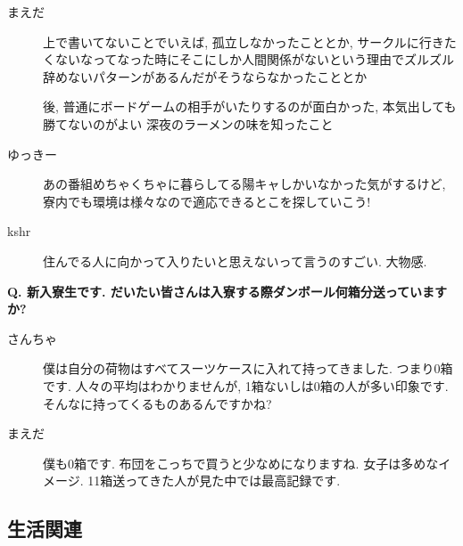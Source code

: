 \documentclass[10pt,b5jsbook,dvips,dvipdfmx,openany]{jsbook}
\theoremstyle{definition}
\begin{document}
\begin{multicols}{2}
\begin{description}
		\item[まえだ]
		上で書いてないことでいえば, 孤立しなかったこととか, サークルに行きたくないなってなった時にそこにしか人間関係がないという理由でズルズル辞めないパターンがあるんだがそうならなかったこととか

		後, 普通にボードゲームの相手がいたりするのが面白かった, 本気出しても勝てないのがよい
		深夜のラーメンの味を知ったこと

		\item[ゆっきー]
		あの番組めちゃくちゃに暮らしてる陽キャしかいなかった気がするけど, 寮内でも環境は様々なので適応できるとこを探していこう!

		\item[kshr]
		住んでる人に向かって入りたいと思えないって言うのすごい. 大物感.
		\end{description}

		\begin{tcolorbox}
		\textbf{Q. 新入寮生です. だいたい皆さんは入寮する際ダンボール何箱分送っていますか?}
		\end{tcolorbox}
		\begin{description}
		\item[さんちゃ]
		僕は自分の荷物はすべてスーツケースに入れて持ってきました. つまり0箱です. 人々の平均はわかりませんが, 1箱ないしは0箱の人が多い印象です. そんなに持ってくるものあるんですかね?

		\item[まえだ]
		僕も0箱です. 布団をこっちで買うと少なめになりますね. 女子は多めなイメージ.  11箱送ってきた人が見た中では最高記録です.
		\end{description}



		\end{multicols}


		\subsection{生活関連}
\end{document}

